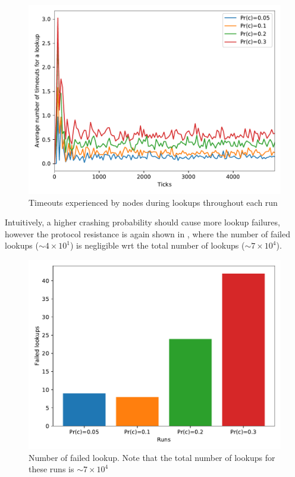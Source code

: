 \documentclass[11pt,twocolumn,letterpaper]{article}
\begin{document}
		\begin{figure}[!h]
			\centering
			\includegraphics[width=\linewidth,clip,trim=0 0.5cm 0 0.35cm]{figures/analysis1/timeouts_time.pdf}
			\caption{Timeouts experienced by nodes during lookups throughout each run}
			\label{fig:crash5}
		\end{figure}

		Intuitively, a higher crashing probability should cause more lookup failures, however the protocol resistance is again shown in , where the number of failed lookups ($\sim4\times10^1$) is negligible wrt the total number of lookups ($\sim7\times10^4$). 

		\begin{figure}[!h]
			\centering
			\includegraphics[width=\linewidth,clip,trim=0 0.5cm 0 0.35cm]{figures/analysis1/failedlookups.pdf}
			\caption{Number of failed lookup. Note that the total number of lookups for these runs is $\sim7\times10^4$}
			\label{fig:crash6}
		\end{figure}
	
\end{document}
